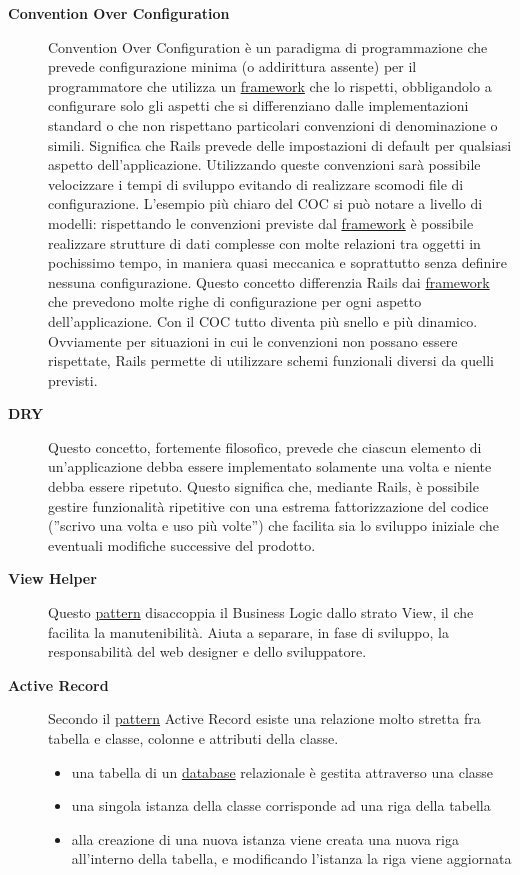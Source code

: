 \documentclass[11pt,a4paper]{article}
\begin{document}
\begin{description}
\item[\textbf{Convention Over Configuration}]
Convention Over Configuration è un paradigma di programmazione che prevede configurazione minima (o addirittura assente) per il programmatore che utilizza un \underline{framework} che lo rispetti, obbligandolo a configurare solo gli aspetti che si differenziano dalle implementazioni standard o che non rispettano particolari convenzioni di denominazione o simili.
Significa che Rails prevede delle impostazioni di default per qualsiasi aspetto dell’applicazione. Utilizzando queste convenzioni sarà possibile velocizzare i tempi di sviluppo evitando di realizzare scomodi file di configurazione. L’esempio più chiaro del COC si può notare a livello di modelli: rispettando le convenzioni previste dal \underline{framework} è possibile realizzare strutture di dati complesse con molte relazioni tra oggetti in pochissimo tempo, in maniera quasi meccanica e soprattutto senza definire nessuna configurazione. Questo concetto differenzia Rails dai \underline{framework} che prevedono molte righe di configurazione per ogni aspetto dell’applicazione. Con il COC tutto diventa più snello e più dinamico. Ovviamente per situazioni in cui le convenzioni non possano essere rispettate, Rails permette di utilizzare schemi funzionali diversi da quelli previsti.
\item[\textbf{DRY}]
Questo concetto, fortemente filosofico, prevede che ciascun elemento di un’applicazione debba essere implementato solamente una volta e niente debba essere ripetuto. Questo significa che, mediante Rails, è possibile gestire funzionalità ripetitive con una estrema fattorizzazione del codice (''scrivo una volta e uso più volte'') che facilita sia lo sviluppo iniziale che eventuali modifiche successive del prodotto.
\item[\textbf{View Helper}]
Questo \underline{pattern} disaccoppia il Business Logic dallo strato View, il che facilita
la manutenibilità. Aiuta a separare, in fase di sviluppo, la responsabilità
del web designer e dello sviluppatore.
\item[\textbf{Active Record}]
Secondo il \underline{pattern} Active Record esiste una relazione molto stretta fra tabella e classe, colonne e attributi della classe. 
\begin{itemize}
 \item una tabella di un \underline{database} relazionale è gestita attraverso una classe
\item una singola istanza della classe corrisponde ad una riga della tabella
\item alla creazione di una nuova istanza viene creata una nuova riga all'interno della tabella, e modificando l'istanza la riga viene aggiornata
\end{itemize}
\end{description}
\end{document}
